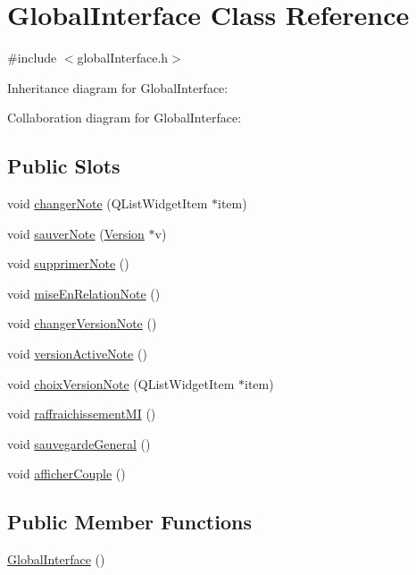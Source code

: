 \hypertarget{classGlobalInterface}{}\section{Global\+Interface Class Reference}
\label{classGlobalInterface}


{\ttfamily \#include $<$global\+Interface.\+h$>$}



Inheritance diagram for Global\+Interface\+:


Collaboration diagram for Global\+Interface\+:
\subsection*{Public Slots}
\begin{DoxyCompactItemize}
\item 
void \hyperlink{classGlobalInterface_ae3736c79b941a90a03272d9d4f80ae94}{changer\+Note} (Q\+List\+Widget\+Item $\ast$item)
\item 
void \hyperlink{classGlobalInterface_a881b8ab006b992e4b31927193d889165}{sauver\+Note} (\hyperlink{classVersion}{Version} $\ast$v)
\item 
void \hyperlink{classGlobalInterface_a8942720e605089c74feab18bfa48079f}{supprimer\+Note} ()
\item 
void \hyperlink{classGlobalInterface_ab820c3c437fbf4802afa346e6c538367}{mise\+En\+Relation\+Note} ()
\item 
void \hyperlink{classGlobalInterface_a12db9cc3abc0015ff7edae0b889f9aeb}{changer\+Version\+Note} ()
\item 
void \hyperlink{classGlobalInterface_a85b9329cc89a38952ebc10847b390790}{version\+Active\+Note} ()
\item 
void \hyperlink{classGlobalInterface_a3ad6a2b8048f1c69cf1f60676cf8fc83}{choix\+Version\+Note} (Q\+List\+Widget\+Item $\ast$item)
\item 
void \hyperlink{classGlobalInterface_a56dc1e9a28e69cd30fb52007f57c46bc}{raffraichissement\+MI} ()
\item 
void \hyperlink{classGlobalInterface_a19759d08dbd776881a4ac4fa116138d1}{sauvegarde\+General} ()
\item 
void \hyperlink{classGlobalInterface_a848014b3b3c1f4668a4a6d6ada4fa6ef}{afficher\+Couple} ()
\end{DoxyCompactItemize}
\subsection*{Public Member Functions}
\begin{DoxyCompactItemize}
\item 
\hyperlink{classGlobalInterface_a1ddc8d3fdaa5c68f2580df970cdafc85}{Global\+Interface} ()
\end{DoxyCompactItemize}


